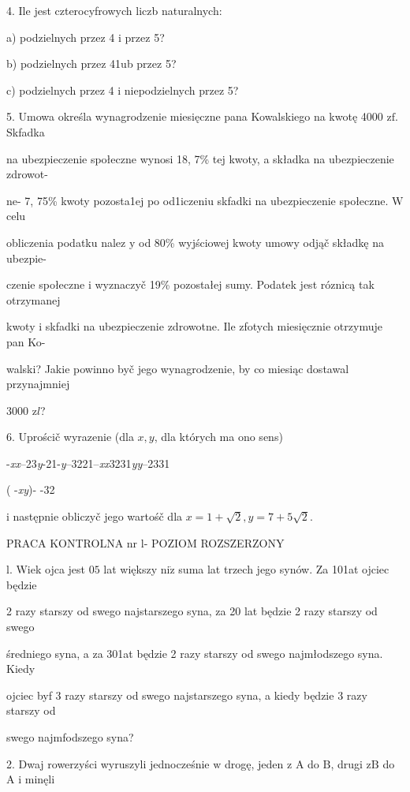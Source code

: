 \documentclass[a4paper,12pt]{article}
\begin{document}
4. Ile jest czterocyfrowych liczb naturalnych:

a) podzielnych przez 4 $\mathrm{i}$ przez 5?

b) podzielnych przez 41ub przez 5?

c) podzielnych przez 4 $\mathrm{i}$ niepodzielnych przez 5?

5. Umowa określa wynagrodzenie miesięczne pana Kowalskiego na kwotę 4000 $\mathrm{z}\mathrm{f}$. Skfadka

na ubezpieczenie społeczne wynosi 18, 7\% tej kwoty, a składka na ubezpieczenie zdrowot-

ne- 7, 75\% kwoty pozosta1ej po od1iczeniu skfadki na ubezpieczenie społeczne. $\mathrm{W}$ celu

obliczenia podatku nalez $\mathrm{y}$ od 80\% wyjściowej kwoty umowy odjąč składkę na ubezpie-

czenie społeczne $\mathrm{i}$ wyznaczyč 19\% pozostałej sumy. Podatek jest róznicą tak otrzymanej

kwoty $\mathrm{i}$ skfadki na ubezpieczenie zdrowotne. Ile zfotych miesięcznie otrzymuje pan Ko-

walski? Jakie powinno byč jego wynagrodzenie, by co miesiąc dostawal przynajmniej

3000 $\mathrm{z}l$?

6. Uprościč wyrazenie (dla $x, y$, dla których ma ono sens)

-{\it xx}--23{\it y}-21-{\it y}--3221--{\it xx}3231{\it yy}--2331

( -{\it xy})- -32

$\mathrm{i}$ następnie obliczyč jego wartośč dla $x=1+\sqrt{2}, y=7+5\sqrt{2}.$




PRACA KONTROLNA nr l- POZIOM ROZSZERZONY

l. Wiek ojca jest $05$ lat większy $\mathrm{n}\mathrm{i}\dot{\mathrm{z}}$ suma lat trzech jego synów. Za 101at ojciec będzie

2 razy starszy od swego najstarszego syna, za 20 lat będzie 2 razy starszy od swego

średniego syna, a za 301at będzie 2 razy starszy od swego najmłodszego syna. Kiedy

ojciec byf 3 razy starszy od swego najstarszego syna, a kiedy będzie 3 razy starszy od

swego najmfodszego syna?

2. Dwaj rowerzyści wyruszyli jednocześnie $\mathrm{w}$ drogę, jeden $\mathrm{z}$ A do $\mathrm{B}$, drugi $\mathrm{z}\mathrm{B}$ do A $\mathrm{i}$ minęli
\end{document}
